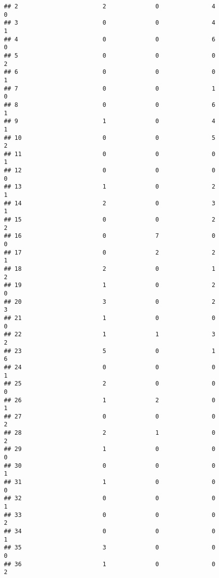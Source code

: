 \documentclass[
]{article}
\begin{document}
\begin{verbatim}
## 2                        2              0               4              0
## 3                        0              0               4              1
## 4                        0              0               6              0
## 5                        0              0               0              2
## 6                        0              0               0              1
## 7                        0              0               1              0
## 8                        0              0               6              1
## 9                        1              0               4              1
## 10                       0              0               5              2
## 11                       0              0               0              1
## 12                       0              0               0              0
## 13                       1              0               2              1
## 14                       2              0               3              1
## 15                       0              0               2              2
## 16                       0              7               0              0
## 17                       0              2               2              1
## 18                       2              0               1              2
## 19                       1              0               2              0
## 20                       3              0               2              3
## 21                       1              0               0              0
## 22                       1              1               3              2
## 23                       5              0               1              6
## 24                       0              0               0              1
## 25                       2              0               0              0
## 26                       1              2               0              1
## 27                       0              0               0              2
## 28                       2              1               0              2
## 29                       1              0               0              0
## 30                       0              0               0              1
## 31                       1              0               0              0
## 32                       0              0               0              1
## 33                       0              0               0              2
## 34                       0              0               0              1
## 35                       3              0               0              0
## 36                       1              0               0              2

\end{verbatim}
\end{document}
